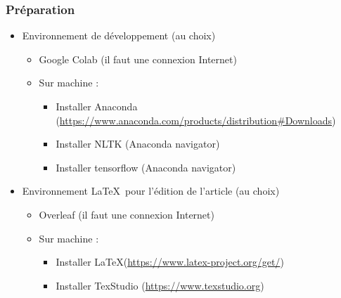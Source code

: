 \documentclass{beamer}
\begin{document}
\begin{frame}
	\frametitle{Préparation}
	
	\begin{itemize}
		\item Environnement de développement (au choix)
		\begin{itemize}
			\item Google Colab (il faut une connexion Internet)
			\item Sur machine :
			\begin{itemize}
				\item Installer Anaconda ({\tiny \url{https://www.anaconda.com/products/distribution\#Downloads}})
				\item Installer NLTK (Anaconda navigator)
				\item Installer tensorflow (Anaconda navigator)
			\end{itemize}
		\end{itemize}
		\item Environnement \LaTeX\ pour l'édition de l'article (au choix)
		\begin{itemize}
			\item Overleaf (il faut une connexion Internet)
			\item Sur machine :
			\begin{itemize}
				\item Installer \LaTeX ({\tiny \url{https://www.latex-project.org/get/}})
				\item Installer TexStudio ({\tiny \url{https://www.texstudio.org}})
			\end{itemize}
		\end{itemize}
	\end{itemize}
	
\end{frame}
\end{document}
